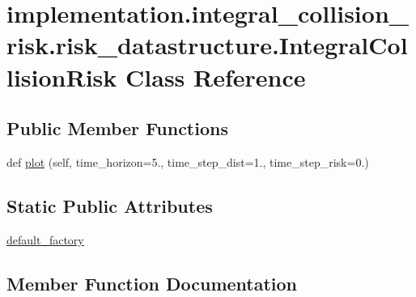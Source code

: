 \hypertarget{classimplementation_1_1integral__collision__risk_1_1risk__datastructure_1_1_integral_collision_risk}{}\section{implementation.\+integral\+\_\+collision\+\_\+risk.\+risk\+\_\+datastructure.\+Integral\+Collision\+Risk Class Reference}
\label{classimplementation_1_1integral__collision__risk_1_1risk__datastructure_1_1_integral_collision_risk}
\subsection*{Public Member Functions}
\begin{DoxyCompactItemize}
\item 
def \hyperlink{classimplementation_1_1integral__collision__risk_1_1risk__datastructure_1_1_integral_collision_risk_a43d7a96beb86dd4137b0024fd268aff0}{plot} (self, time\+\_\+horizon=5., time\+\_\+step\+\_\+dist=1., time\+\_\+step\+\_\+risk=0.)
\end{DoxyCompactItemize}
\subsection*{Static Public Attributes}
\begin{DoxyCompactItemize}
\item 
\hyperlink{classimplementation_1_1integral__collision__risk_1_1risk__datastructure_1_1_integral_collision_risk_a24949b7fedd335e556517f423b76eb64}{default\+\_\+factory}
\end{DoxyCompactItemize}


\subsection{Member Function Documentation}
\mbox{\label{classimplementation_1_1integral__collision__risk_1_1risk__datastructure_1_1_integral_collision_risk_a43d7a96beb86dd4137b0024fd268aff0}} 
